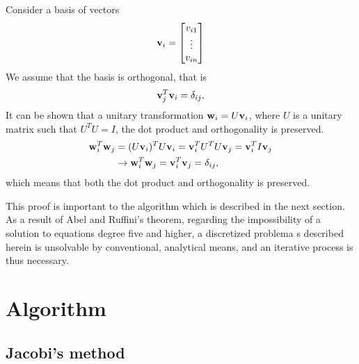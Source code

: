 \documentclass[10pt, a4paper]{amsart}
\begin{document}
Consider a basis of vectors 
\begin{equation}
\vb{v}_i = \begin{bmatrix}
v_{i1} \\
\vdots \\
v_{in}
\end{bmatrix}
\end{equation}
We assume that the basis is orthogonal, that is
\begin{equation}
\vb{v}_j^T\vb{v}_i=\delta_{ij}.
\end{equation}
It can be shown that a unitary transformation $\vb{w}_i = U\vb{v}_i$, where $U$ is a unitary matrix such that $U^TU=I$, the dot product and orthogonality is preserved. 
\begin{align}
\vb{w}_i^T\vb{w}_j &= (U\vb{v}_i)^T  U\vb{v}_i= \vb{v}_i^TU^T U\vb{v}_j = \vb{v}_i^T I \vb{v}_j \nonumber \\
&\rightarrow \vb{w}_i^T\vb{w}_j = \vb{v}_i^T\vb{v}_j = \delta_{ij},
\end{align}
which means that both the dot product and orthogonality is preserved.

This proof is important to the algorithm which is described in the next section. As a result of Abel and Ruffini's theorem, regarding the impossibility of a solution to equations degree five and higher, a discretized problema s described herein is unsolvable by conventional, analytical means, and an iterative process is thus necessary.

\section{Algorithm}

\subsection{Jacobi's method}
\end{document}
